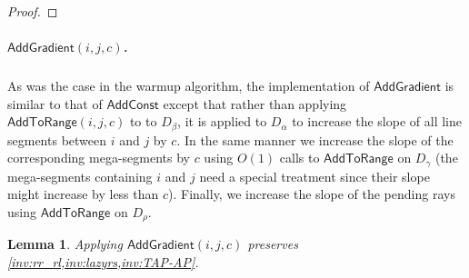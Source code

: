 \documentclass[10pt,a4paper]{article}
\newtheorem{lemma}[theorem]{Lemma}
\newcommand{\AC}{\mathsf{AddConst}}
\newcommand{\AtR}{\mathsf{AddToRange}}
\newcommand{\AG}{\mathsf{AddGradient}}
\newcommand{\para}[1]{\vspace{-0.1in} \subparagraph*{#1}}
\begin{document}
\begin{proof}
\end{proof}

\para{$\AG(i,j,c)$.}
As was the case in the warmup algorithm, the implementation of $\AG$ is similar to that of $\AC$ except that rather than applying $\AtR(i,j,c)$ to to $D_\beta$, it is applied to $D_\alpha$ to increase the slope of all line segments between $i$ and $j$ by $c$. In the same manner we increase the slope of the corresponding mega-segments by $c$ using $O(1)$ calls to $\AtR$ on $D_\gamma$ (the mega-segments containing $i$ and $j$ need a special treatment since their slope might increase by less than $c$).
Finally, we increase the slope of the pending rays using $\AtR$ on $D_\rho$. 

\begin{lemma}\label{lem:addgrad}
    Applying $\AG(i,j,c)$ preserves \cref{inv:rr_rl,inv:lazyrs,inv:TAP-AP}.
\end{lemma}
\end{document}
